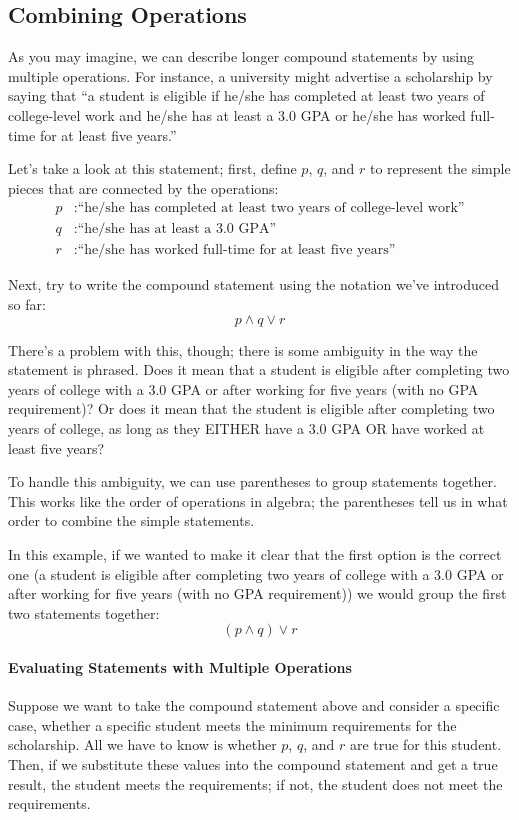 \subsection{Combining Operations}
As you may imagine, we can describe longer compound statements by using multiple operations.  For instance, a university might advertise a scholarship by saying that ``a student is eligible if he/she has completed at least two years of college-level work and he/she has at least a 3.0 GPA or he/she has worked full-time for at least five years.''

Let's take a look at this statement; first, define $p$, $q$, and $r$ to represent the simple pieces that are connected by the operations:
\begin{align*}
p &: \textrm{``he/she has completed at least two years of college-level work''}\\
q &: \textrm{``he/she has at least a 3.0 GPA''}\\
r &: \textrm{``he/she has worked full-time for at least five years''}
\end{align*}

Next, try to write the compound statement using the notation we've introduced so far:
\[p \wedge q \vee r\]

There's a problem with this, though; there is some ambiguity in the way the statement is phrased.  Does it mean that a student is eligible after completing two years of college with a 3.0 GPA or after working for five years (with no GPA requirement)?  Or does it mean that the student is eligible after completing two years of college, as long as they EITHER have a 3.0 GPA OR have worked at least five years?

To handle this ambiguity, we can use parentheses to group statements together.  This works like the order of operations in algebra; the parentheses tell us in what order to combine the simple statements.

In this example, if we wanted to make it clear that the first option is the correct one (a student is eligible after completing two years of college with a 3.0 GPA or after working for five years (with no GPA requirement)) we would group the first two statements together:
\[(p \wedge q) \vee r\]

\paragraph{Evaluating Statements with Multiple Operations}
Suppose we want to take the compound statement above and consider a specific case, whether a specific student meets the minimum requirements for the scholarship.  All we have to know is whether $p$, $q$, and $r$ are true for this student.  Then, if we substitute these values into the compound statement and get a true result, the student meets the requirements; if not, the student does not meet the requirements.

